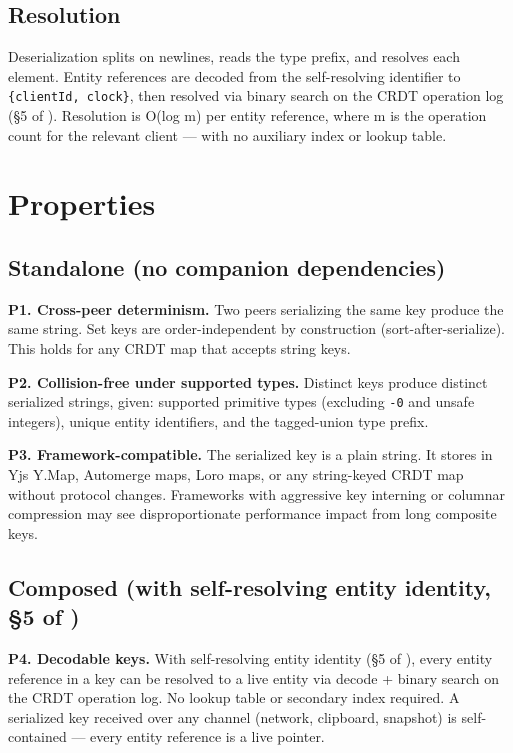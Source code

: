 \subsection{Resolution}

Deserialization splits on newlines, reads the type prefix, and resolves each element. Entity references are decoded from the self-resolving identifier to \texttt{\{clientId, clock\}}, then resolved via binary search on the CRDT operation log (\S 5 of \cite{plexus:arch}). Resolution is O(log m) per entity reference, where m is the operation count for the relevant client --- with no auxiliary index or lookup table.

\section{Properties}

\subsection{Standalone (no companion dependencies)}

\textbf{P1. Cross-peer determinism.} Two peers serializing the same key produce the same string. Set keys are order-independent by construction (sort-after-serialize). This holds for any CRDT map that accepts string keys.

\textbf{P2. Collision-free under supported types.} Distinct keys produce distinct serialized strings, given: supported primitive types (excluding \texttt{-0} and unsafe integers), unique entity identifiers, and the tagged-union type prefix.

\textbf{P3. Framework-compatible.} The serialized key is a plain string. It stores in Yjs Y.Map, Automerge maps, Loro maps, or any string-keyed CRDT map without protocol changes. Frameworks with aggressive key interning or columnar compression may see disproportionate performance impact from long composite keys.

\subsection{Composed (with self-resolving entity identity, \S 5 of \cite{plexus:arch})}

\textbf{P4. Decodable keys.} With self-resolving entity identity (\S 5 of \cite{plexus:arch}), every entity reference in a key can be resolved to a live entity via decode + binary search on the CRDT operation log. No lookup table or secondary index required. A serialized key received over any channel (network, clipboard, snapshot) is self-contained --- every entity reference is a live pointer.

